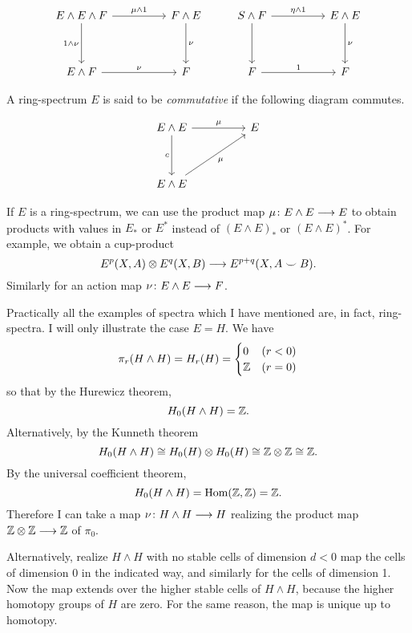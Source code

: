 \documentclass[../main]{subfiles}
\begin{document}
\[
\begin{tikzcd}
E \wedge E \wedge F \arrow[dd, "1 \wedge \nu"'] \arrow[rr, "\mu \wedge 1"] &  & F \wedge E \arrow[dd, "\nu"] & S \wedge F \arrow[rr, "\eta \wedge 1"] \arrow[dd] &  & E \wedge E \arrow[dd, "\nu"] \\
                                                                           &  &                              &                                                   &  &                              \\
E \wedge F \arrow[rr, "\nu"]                                               &  & F                            & F \arrow[rr, "1"]                                 &  & F                           
\end{tikzcd}
\]


A ring-spectrum $E$ is said to be \emph{commutative} if the following diagram commutes.



\[
\begin{tikzcd}
E \wedge E \arrow[rr, "\mu"] \arrow[dd, "c"'] &  & E \\
                                              &  &   \\
E \wedge E \arrow[rruu, "\mu"']               &  &  
\end{tikzcd}
\]


If $E$ is a ring-spectrum, we can use the product map $\mu \colon E \wedge E \longrightarrow E$ to obtain products with values in $E_*$ or $E^*$ instead of $(E \wedge E)_*$ or $(E \wedge E)^*$. For example, we obtain a cup-product 
\[E^p(X,A) \otimes E^q(X,B) \longrightarrow E^{p+q}(X,A \smile B).\]
Similarly for an action map $\nu \colon E \wedge E \longrightarrow F$.

Practically all the examples of spectra which I have mentioned are, in fact, ring-spectra. I will only illustrate the case $E=H$. We have
\[\pi_r (H \wedge H) = H_r(H) = \begin{cases}
    0 & (r < 0) \\
    \mathbb{Z} & (r=0)
\end{cases}\]
so that by the Hurewicz theorem,
\[H_0(H \wedge H) = \mathbb{Z}.\]
Alternatively, by the Kunneth theorem
\[H_0(H \wedge H) \cong H_0(H) \otimes H_0(H) \cong \mathbb{Z} \otimes \mathbb{Z} \cong \mathbb{Z}.\]
By the universal coefficient theorem,
\[H_0(H \wedge H) = \mathop{\mathrm{Hom}}(\mathbb{Z},\mathbb{Z}) = \mathbb{Z}.\]
Therefore I can take a map $\nu \colon H \wedge H \longrightarrow H$ realizing the product map $\mathbb{Z} \otimes \mathbb{Z} \longrightarrow \mathbb{Z}$ of $\pi_0$.

Alternatively, realize $H \wedge H$ with no stable cells of dimension $d < 0$ map the cells of dimension 0 in the indicated way, and similarly for the cells of dimension 1. Now the map extends over the higher stable cells of $H \wedge H$, because the higher homotopy groups of $H$ are zero. For the same reason, the map is unique up to homotopy.
\end{document}
